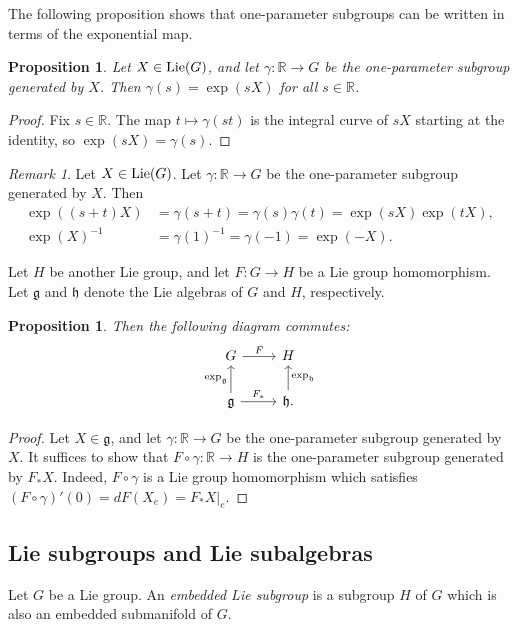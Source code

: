 \documentclass{amsart}
\newcommand{\R}{\mathbb R}
\newcommand{\lie}{\text{\normalfont Lie}}
\newcommand{\h}{\mathfrak h}
\newcommand{\g}{\mathfrak g}
\theoremstyle{plain}
\newtheorem{proposition}[theorem]{Proposition}
\theoremstyle{definition}
\theoremstyle{remark}
\newtheorem{remark}[theorem]{Remark}
\begin{document}
	The following proposition shows that one-parameter subgroups can be written in terms of the exponential map.
	\begin{proposition}
		Let $X \in \lie(G)$, and let $\gamma:\R \rightarrow G$ be the one-parameter subgroup generated by $X$. Then 
		$\gamma(s) = \exp(sX)$ for all $s \in \R$.
	\end{proposition}
	\begin{proof}
		Fix $s \in \R$. The map $t \mapsto \gamma(st)$ is the integral curve of $sX$ starting at the identity, so $\exp(sX) = \gamma(s)$.
	\end{proof}
	
	\begin{remark}
		Let $X \in \lie(G)$. Let $\gamma:\R \rightarrow G$ be the one-parameter subgroup generated by $X$. Then 
		\begin{align*}
			\exp((s+t)X) &= \gamma(s+t) = \gamma(s) \gamma(t) =  \exp(sX) \exp(tX), \\
			\exp(X)^{-1} &= \gamma(1)^{-1} = \gamma(-1) = \exp(-X).
		\end{align*}
	\end{remark}


	Let $H$ be another Lie group, and let $F:G \rightarrow H$ be a Lie group homomorphism. Let $\g$ and $\h$ denote the Lie algebras of $G$ and $H$, respectively.
	\begin{proposition}
		\label{natural}
		Then the following diagram commutes:
		$$\begin{tikzcd}
			G \arrow{r}{F} & H \\
			\g \arrow{r}{F_*} \arrow{u}{\exp_\g}& \h \arrow[swap]{u}{\exp_\h}. 
		\end{tikzcd}$$
	\end{proposition}
	\begin{proof}
		Let $X \in \g$, and let $\gamma:\R \rightarrow G$ be the one-parameter subgroup generated by $X$. It suffices to show that $F \circ \gamma: \R \rightarrow H$ is the one-parameter subgroup generated by $F_*X$. Indeed, $F \circ \gamma$ is a Lie group homomorphism which satisfies $(F \circ \gamma)'(0) = dF(X_e) = F_* X|_e$.
	\end{proof}

	\subsection{Lie subgroups and Lie subalgebras}
	Let $G$ be a Lie group. An \emph{embedded Lie subgroup} is a subgroup $H$ of $G$ which is also an embedded submanifold of $G$.
	
\end{document}
